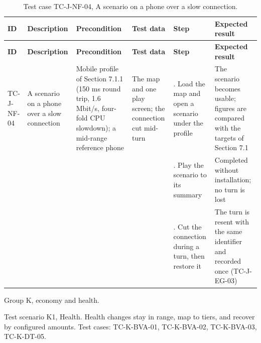 {\footnotesize{}\renewcommand{\arraystretch}{1.1}
\begin{longtable}{|>{\raggedright\arraybackslash}p{}|>{\raggedright\arraybackslash}p{}|>{\raggedright\arraybackslash}p{}|>{\raggedright\arraybackslash}p{}|>{\raggedright\arraybackslash}p{}|>{\raggedright\arraybackslash}p{}|}
\caption{Test case TC-J-NF-04, A scenario on a phone over a slow connection.} \\
\hline
\textbf{ID} & \textbf{Description} & \textbf{Precondition} & \textbf{Test data} & \textbf{Step} & \textbf{Expected result} \\ \hline
\endfirsthead
\hline
\textbf{ID} & \textbf{Description} & \textbf{Precondition} & \textbf{Test data} & \textbf{Step} & \textbf{Expected result} \\ \hline
\endhead
TC-J-NF-04 & A scenario on a phone over a slow connection & Mobile profile of Section 7.1.1 (150 ms round trip, 1.6 Mbit/s, four-fold CPU slowdown); a mid-range reference phone & The map and one play screen; the connection cut mid-turn & 1. Load the map and open a scenario under the profile & The scenario becomes usable; figures are compared with the targets of Section 7.1 \\ \cline{5-6}
 &  &  &  & 2. Play the scenario to its summary & Completed without installation; no turn is lost \\ \cline{5-6}
 &  &  &  & 3. Cut the connection during a turn, then restore it & The turn is resent with the same identifier and recorded once (TC-\allowbreak{}J-\allowbreak{}EG-\allowbreak{}03) \\ \hline
\end{longtable}
}

Group K, economy and health.

Test scenario K1, Health. Health changes stay in range, map to tiers, and recover by configured amounts. Test cases: TC-\allowbreak{}K-\allowbreak{}BVA-\allowbreak{}01, TC-\allowbreak{}K-\allowbreak{}BVA-\allowbreak{}02, TC-\allowbreak{}K-\allowbreak{}BVA-\allowbreak{}03, TC-K-DT-05.

